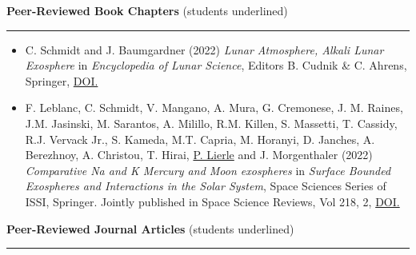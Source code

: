 \documentclass[12pt]{report}
\begin{document}
\vspace{2 mm}
\noindent\textbf{Peer-Reviewed Book Chapters} (students underlined) \rm\hspace*{\fill} \\
\rule{\textwidth}{1pt}
\begin{itemize} \itemsep -2pt %
  \item C. Schmidt and J. Baumgardner (2022) \textit{Lunar Atmosphere, Alkali Lunar Exosphere} in \textit{Encyclopedia of Lunar Science}, Editors B. Cudnik \& C. Ahrens, Springer, \href{https://doi.org/10.1007/978-3-319-05546-6_230-1}{DOI.}
  \item F. Leblanc, C. Schmidt, V. Mangano, A. Mura, G. Cremonese, J. M. Raines, J.M. Jasinski, M. Sarantos, A. Milillo, R.M. Killen, S. Massetti, T. Cassidy, R.J. Vervack Jr., S. Kameda, M.T. Capria, M. Horanyi, D. Janches, A. Berezhnoy, A. Christou, T. Hirai, \underline{P. Lierle} and J. Morgenthaler (2022) \textit{Comparative Na and K Mercury and Moon exospheres} in \textit{Surface Bounded Exospheres and Interactions in the Solar System}, Space Sciences Series of ISSI, Springer. Jointly published in Space Science Reviews, Vol 218, 2, \href{ https://doi.org/10.1007/s11214-022-00871-w}{DOI.}
 \end{itemize}
\vspace{2 mm}
\noindent\textbf{Peer-Reviewed Journal Articles} (students underlined) \rm\hspace*{\fill} \\
\rule{\textwidth}{1pt}
\end{document}
